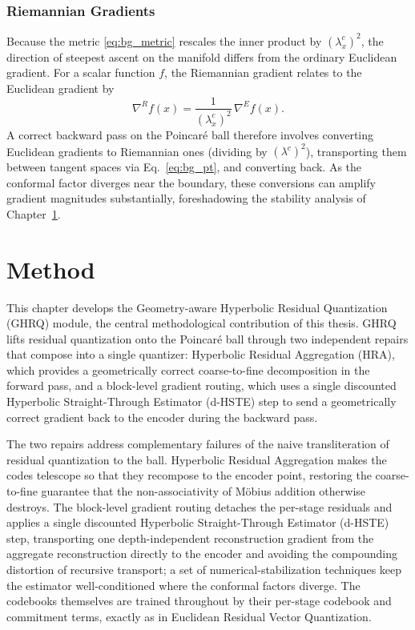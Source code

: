 \documentclass[12pt]{report}
\begin{document}
\subsection{Riemannian Gradients}
Because the metric \ref{eq:bg_metric} rescales the inner product by $(\lambda_x^c)^2$, the direction of steepest ascent on the manifold differs from the ordinary Euclidean gradient. For a scalar function $f$, the Riemannian gradient relates to the Euclidean gradient by
\begin{equation}
    \label{eq:bg_riemgrad}
    \nabla^R f(x) = \frac{1}{(\lambda_x^c)^2}\,\nabla^E f(x).
\end{equation}
A correct backward pass on the Poincar\'e ball therefore involves converting Euclidean gradients to Riemannian ones (dividing by $(\lambda^c)^2$), transporting them between tangent spaces via Eq.~\ref{eq:bg_pt}, and converting back. As the conformal factor diverges near the boundary, these conversions can amplify gradient magnitudes substantially, foreshadowing the stability analysis of Chapter~\ref{chap:methods}.

\chapter{Method}
\label{chap:methods}

\label{sec:ghrq}
This chapter develops the Geometry-aware Hyperbolic Residual Quantization (GHRQ) module, the central methodological contribution of this thesis. GHRQ lifts residual quantization onto the Poincar\'e ball through two independent repairs that compose into a single quantizer: Hyperbolic Residual Aggregation (HRA), which provides a geometrically correct coarse-to-fine decomposition in the forward pass, and a block-level gradient routing, which uses a single discounted Hyperbolic Straight-Through Estimator (d-HSTE) step to send a geometrically correct gradient back to the encoder during the backward pass.

The two repairs address complementary failures of the naive transliteration of residual quantization to the ball. Hyperbolic Residual Aggregation makes the codes telescope so that they recompose to the encoder point, restoring the coarse-to-fine guarantee that the non-associativity of M\"obius addition otherwise destroys. The block-level gradient routing detaches the per-stage residuals and applies a single discounted Hyperbolic Straight-Through Estimator (d-HSTE) step, transporting one depth-independent reconstruction gradient from the aggregate reconstruction directly to the encoder and avoiding the compounding distortion of recursive transport; a set of numerical-stabilization techniques keep the estimator well-conditioned where the conformal factors diverge. The codebooks themselves are trained throughout by their per-stage codebook and commitment terms, exactly as in Euclidean Residual Vector Quantization.
\end{document}
